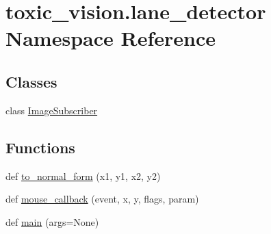 \hypertarget{namespacetoxic__vision_1_1lane__detector}{}\section{toxic\+\_\+vision.\+lane\+\_\+detector Namespace Reference}
\label{namespacetoxic__vision_1_1lane__detector}
\subsection*{Classes}
\begin{DoxyCompactItemize}
\item 
class \mbox{\hyperlink{classtoxic__vision_1_1lane__detector_1_1ImageSubscriber}{Image\+Subscriber}}
\end{DoxyCompactItemize}
\subsection*{Functions}
\begin{DoxyCompactItemize}
\item 
def \mbox{\hyperlink{namespacetoxic__vision_1_1lane__detector_ae3bdbfab97718df7c906f65d19f10dfd}{to\+\_\+normal\+\_\+form}} (x1, y1, x2, y2)
\item 
def \mbox{\hyperlink{namespacetoxic__vision_1_1lane__detector_a365ec8dd4fef50dc9623183b3e39e22d}{mouse\+\_\+callback}} (event, x, y, flags, param)
\item 
def \mbox{\hyperlink{namespacetoxic__vision_1_1lane__detector_a7a56502e886845d86ce39e37d087b5a8}{main}} (args=None)
\end{DoxyCompactItemize}
